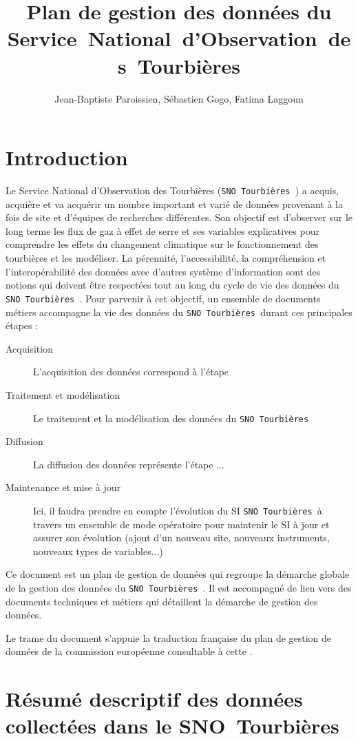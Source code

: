 \documentclass[]{article}
\title{Plan de gestion des données du Service~National~d'Observation~des~Tourbières}
\author{Jean-Baptiste Paroissien, Sébastien Gogo, Fatima Laggoun}
\newcommand{\mhref}[3][blue]{\href{#2}{\color{#1}{#3}}}%
\newcommand{\SNOT}{{\tt SNO~Tourbières }}
\begin{document}
	\maketitle
\section{Introduction}
Le Service National d'Observation des Tourbières (\SNOT) a acquis, acquière et va acquérir un nombre important et varié de données provenant à la fois de site et d'équipes de recherches différentes. Son objectif est d'observer sur le long terme les flux de gaz à effet de serre et ses variables explicatives pour comprendre les effets du changement climatique sur le fonctionnement des tourbières et les modéliser. La pérennité, l'accessibilité, la compréhension et l'interopérabilité des données avec d'autres système d'information sont des notions qui doivent être respectées tout au long du cycle de vie des données du \SNOT. Pour parvenir à cet objectif, un ensemble de documents \og{} métiers \fg{} accompagne la vie des données du \SNOT durant ces principales étapes :

\begin{description}
	\item[Acquisition] L'acquisition des données correspond à l'étape
	\item[Traitement et modélisation] Le traitement et la modélisation des données du \SNOT
	\item[Diffusion] La diffusion des données représente l'étape ...
	\item[Maintenance et mise à jour] Ici, il faudra prendre en compte l'évolution du SI \SNOT à travers un ensemble de mode opératoire pour maintenir le SI à jour et assurer son évolution (ajout d'un nouveau site, nouveaux instruments, nouveaux types de variables...)
\end{description}
	
Ce document est un plan de gestion de données qui regroupe la démarche globale de la gestion des données du \SNOT. Il est accompagné de lien vers des documents techniques et métiers qui détaillent la démarche de gestion des données.
	
Le trame du document s'appuie la traduction française du plan de gestion de données de la commission européenne consultable à cette \mhref{http://www.donneesdelarecherche.fr/IMG/pdf/lignes-directrices_gestion-donnees-fair_horizon2020_version_3.0_tr-fr.pdf}{adresse}. 
	
\section{Résumé descriptif des données collectées dans le SNO~Tourbières}
	
\end{document}
